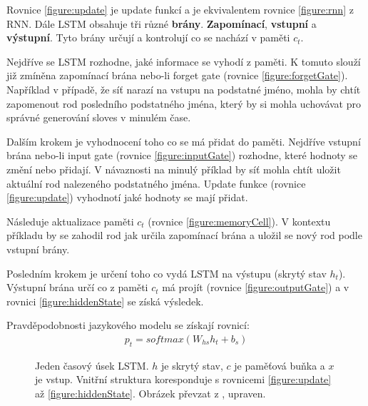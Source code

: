 Rovnice \ref{figure:update} je update funkcí a je ekvivalentem rovnice \ref{figure:rnn} z RNN.
Dále LSTM obsahuje tři různé \textbf{brány}. \textbf{Zapomínací}, \textbf{vstupní} a \textbf{výstupní}. Tyto brány určují a kontrolují co se nachází v paměti $c_t$.

Nejdříve se LSTM rozhodne, jaké informace se vyhodí z paměti. K tomuto slouží již zmíněna zapomínací brána nebo-li forget gate (rovnice \ref{figure:forgetGate}). Například v případě, že síť narazí na vstupu na podstatné jméno, mohla by chtít zapomenout rod posledního podstatného jména, který by si mohla uchovávat pro správné generování sloves v minulém čase.

Dalším krokem je vyhodnocení toho co se má přidat do paměti. Nejdříve vstupní brána nebo-li input gate (rovnice \ref{figure:inputGate}) rozhodne, které hodnoty se změní nebo přidají. V návaznosti na minulý příklad by síť mohla chtít uložit aktuální rod nalezeného podstatného jména. Update funkce (rovnice \ref{figure:update}) vyhodnotí jaké hodnoty se mají přidat.

Následuje aktualizace paměti $c_t$ (rovnice \ref{figure:memoryCell}). V kontextu příkladu by se zahodil rod jak určila zapomínací brána a uložil se nový rod podle vstupní brány.

Posledním krokem je určení toho co vydá LSTM na výstupu (skrytý stav $h_t$). Výstupní brána určí co z paměti $c_t$ má projít (rovnice \ref{figure:outputGate}) a v rovnici \ref{figure:hiddenState} se získá výsledek.

Pravděpodobnosti jazykového modelu se získají rovnicí:
\begin{align}
    p_t = softmax(W_{hs}h_{t} + b_{s})
\end{align}


\begin{figure}[H]
    \begin{center}
    \end{center}
	\caption{Jeden časový úsek LSTM. $h$ je skrytý stav, $c$ je paměťová buňka a $x$ je vstup. Vnitřní struktura koresponduje s rovnicemi \ref{figure:update} až \ref{figure:hiddenState}. Obrázek převzat z \cite{understandingLSTM}, upraven.}
	\label{img:LSTM}
\end{figure}



